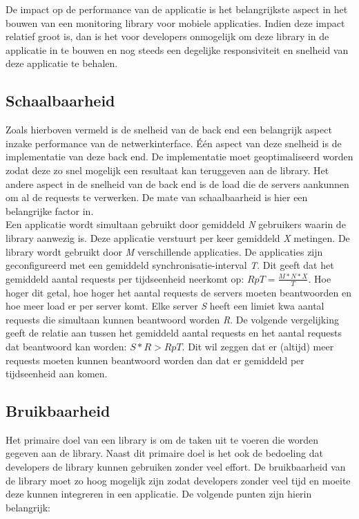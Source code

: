 De impact op de performance van de applicatie is het belangrijkste aspect in het bouwen van een monitoring library voor mobiele applicaties. Indien deze impact relatief groot is, dan is het voor developers onmogelijk om deze library in de applicatie in te bouwen en nog steeds een degelijke responsiviteit en snelheid van deze applicatie te behalen. 

\subsection{Schaalbaarheid}
Zoals hierboven vermeld is de snelheid van de back end een belangrijk aspect inzake performance van de netwerkinterface. \'E\'en aspect van deze snelheid is de implementatie van deze back end. De implementatie moet geoptimaliseerd worden zodat deze zo snel mogelijk een resultaat kan teruggeven aan de library. Het andere aspect in de snelheid van de back end is de load die de servers aankunnen om al de requests te verwerken. De mate van schaalbaarheid is hier een belangrijke factor in. \\

Een applicatie wordt simultaan gebruikt door gemiddeld \textit{N} gebruikers waarin de library aanwezig is. Deze applicatie verstuurt per keer gemiddeld \textit{X} metingen. De library wordt gebruikt door \textit{M} verschillende applicaties. De applicaties zijn geconfigureerd met een gemiddeld synchronisatie-interval \textit{T}. Dit geeft dat het gemiddeld aantal requests per tijdseenheid neerkomt op: $RpT=\frac{M*N*X}{T}$. Hoe hoger dit getal, hoe hoger het aantal requests de servers moeten beantwoorden en hoe meer load er per server komt. Elke server \textit{S} heeft een limiet kwa aantal requests die simultaan kunnen beantwoord worden \textit{R}. De volgende vergelijking geeft de relatie aan tussen het gemiddeld aantal requests en het aantal requests dat beantwoord kan worden: $S*R > RpT$. Dit wil zeggen dat er (altijd) meer requests moeten kunnen beantwoord worden dan dat er gemiddeld per tijdseenheid aan komen.\\



\subsection{Bruikbaarheid}
Het primaire doel van een library is om de taken uit te voeren die worden gegeven aan de library. Naast dit primaire doel is het ook de bedoeling dat developers de library kunnen gebruiken zonder veel effort. De bruikbaarheid van de library moet zo hoog mogelijk zijn zodat developers zonder veel tijd en moeite deze kunnen integreren in een applicatie. De volgende punten zijn hierin belangrijk: 

